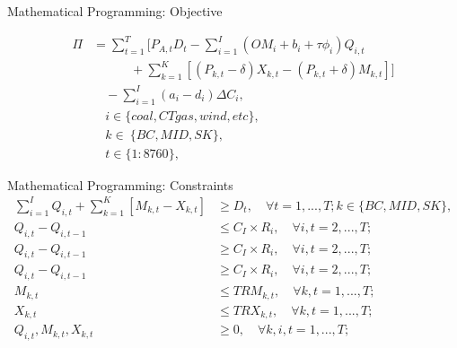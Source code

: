 \documentclass[newPxFont,numfooter,progressbar,sectionpages]{beamer}
\begin{document}

\begin{frame}[c]{Mathematical Programming: Objective}

	\begin{align}\label{eq1}
	  \Pi & = \sum_{t=1}^T  [   P_{A,t} D_t  - \sum_{i=1}^I (OM_i + b_i + \tau \phi_i) Q_{i,t} \nonumber  \\
	      & \qquad {} \quad  + \sum_{k=1}^K  [  (P_{k,t} - \delta ) X_{k,t} - (P_{k,t} + \delta) M_{k,t}  ] ]  \\
	      & \quad - \sum_{i = 1}^I (a_i - d_i) \Delta C_i, \nonumber  \\
	      & \quad i \in \{coal,CT gas, wind, etc \} , \nonumber  \\
	      & \quad k \in \ \{ BC, MID, SK  \},\nonumber \\
	      & \quad t \in \{1:8760\} ,  \nonumber      
	\end{align}


\end{frame}


\begin{frame}[c]{Mathematical Programming: Constraints}
\begin{align}\label{eq2}
	\sum_{i = 1}^I Q_{i,t} + \sum_{k=1}^K  [  M_{k,t} - X_{k,t} ]  &   \ge D_t,\quad \forall t = 1,...,T; k \in  \{ BC, MID, SK  \},   \\
	 Q_{i,t} -    Q_{i,t-1}  & \le C_I \times R_i ,  \quad \forall i,t = 2,...,T; \\
	Q_{i,t} -     Q_{i,t-1}  & \ge C_I \times R_i ,  \quad \forall i,t = 2,...,T; \\
	Q_{i,t} -    Q_{i,t-1}  & \ge C_I \times R_i ,  \quad \forall i,t = 2,...,T; \\
	M_{k,t} & \le TRM_{k,t} ,  \quad \forall k, t=1,...,T; \\
	X_{k,t} & \le TRX_{k,t} ,  \quad \forall k, t=1,...,T; \\
	Q_{i,t}, M_{k,t}, X_{k,t} & \ge 0 ,  \quad \forall k,i,t=1,...,T;
\end{align}

\end{frame}
\end{document}
